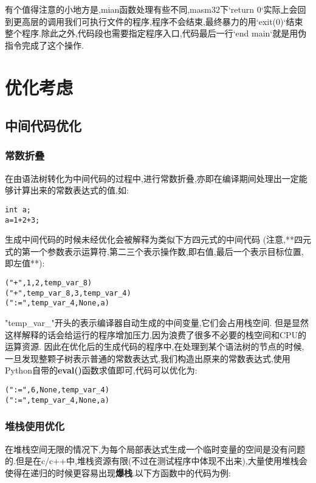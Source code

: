 \documentclass{article}
\begin{document}
有个值得注意的小地方是,mian函数处理有些不同,masm32下`return 0`实际上会回到更高层的调用我们可执行文件的程序,程序不会结束,最终暴力的用`exit(0)`结束整个程序.除此之外,代码段也需要指定程序入口,代码最后一行`end main`就是用伪指令完成了这个操作.

\section{优化考虑}

\subsection{中间代码优化}

\subsubsection{常数折叠}

在由语法树转化为中间代码的过程中,进行常数折叠,亦即在编译期间处理出一定能够计算出来的常数表达式的值,如:

\begin{verbatim}
int a;
a=1+2+3;
\end{verbatim}

生成中间代码的时候未经优化会被解释为类似下方四元式的中间代码
(注意,**四元式的第一个参数表示运算符,第二三个表示操作数,即右值,最后一个表示目标位置,即左值**):

\begin{verbatim}
("+",1,2,temp_var_8)
("+",temp_var_8,3,temp_var_4)
(":=",temp_var_4,None,a)
\end{verbatim}

"temp\_var\_"开头的表示编译器自动生成的中间变量,它们会占用栈空间.
但是显然这样解释的话会给运行的程序增加压力,因为浪费了很多不必要的栈空间和CPU的运算资源.
因此在优化后的生成代码的程序中,在处理到某个语法树的节点的时候,一旦发现整颗子树表示普通的常数表达式,我们构造出原来的常数表达式,使用Python自带的\textbf{eval()}函数求值即可,代码可以优化为:

\begin{verbatim}
(":=",6,None,temp_var_4)
(":=",temp_var_4,None,a)
\end{verbatim}


\subsubsection{堆栈使用优化}

在堆栈空间无限的情况下,为每个局部表达式生成一个临时变量的空间是没有问题的.但是在c/c++中,堆栈资源有限(不过在测试程序中体现不出来),大量使用堆栈会使得在递归的时候更容易出现\textbf{爆栈}.以下方函数中的代码为例:
\end{document}
